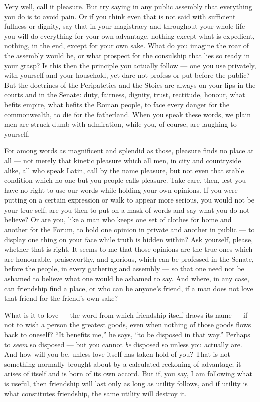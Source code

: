  Very well, call it pleasure. But try saying in any public assembly that everything you do is to avoid pain. Or if you think even that is not said with sufficient fullness or dignity, say that in your magistracy and throughout your whole life you will do everything for your own advantage, nothing except what is expedient, nothing, in the end, except for your own sake. What do you imagine the roar of the assembly would be, or what prospect for the consulship that lies so ready in your grasp? Is this then the principle you actually follow — one you use privately, with yourself and your household, yet dare not profess or put before the public? But the doctrines of the Peripatetics and the Stoics are always on your lips in the courts and in the Senate: duty, fairness, dignity, trust, rectitude, honour, what befits empire, what befits the Roman people, to face every danger for the commonwealth, to die for the fatherland. When you speak these words, we plain men are struck dumb with admiration, while you, of course, are laughing to yourself.

 For among words as magnificent and splendid as those, pleasure finds no place at all — not merely that kinetic pleasure which all men, in city and countryside alike, all who speak Latin, call by the name pleasure, but not even that stable condition which no one but you people calls pleasure. Take care, then, lest you have no right to use our words while holding your own opinions. If you were putting on a certain expression or walk to appear more serious, you would not be your true self; are you then to put on a mask of words and say what you do not believe? Or are you, like a man who keeps one set of clothes for home and another for the Forum, to hold one opinion in private and another in public — to display one thing on your face while truth is hidden within? Ask yourself, please, whether that is right. It seems to me that those opinions are the true ones which are honourable, praiseworthy, and glorious, which can be professed in the Senate, before the people, in every gathering and assembly — so that one need not be ashamed to believe what one would be ashamed to say. And where, in any case, can friendship find a place, or who can be anyone's friend, if a man does not love that friend for the friend's own sake?

 What is it to love — the word from which friendship itself draws its name — if not to wish a person the greatest goods, even when nothing of those goods flows back to oneself? ``It benefits me,'' he says, ``to be disposed in that way.'' Perhaps to \textit{seem} so disposed — but you cannot \textit{be} disposed so unless you actually are. And how will you be, unless love itself has taken hold of you? That is not something normally brought about by a calculated reckoning of advantage; it arises of itself and is born of its own accord. But if, you say, I am following what is useful, then friendship will last only as long as utility follows, and if utility is what constitutes friendship, the same utility will destroy it.

